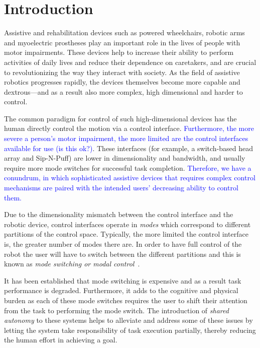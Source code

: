 \documentclass[conference]{IEEEtran}
\begin{document}
\IEEEpeerreviewmaketitle

\section{Introduction}

Assistive and rehabilitation devices such as powered wheelchairs, robotic arms and myoelectric prostheses play an important role in the lives of people with motor impairments. These devices help to increase their ability to perform activities of daily lives and reduce their dependence on caretakers, and are crucial to revolutionizing the way they interact with society. As the field of assistive robotics progresses rapidly, the devices themselves become more capable and dextrous---and as a result also more complex, high dimensional and harder to control. 

The common paradigm for control of such high-dimensional devices has the human directly control the motion via a control interface. \textcolor{blue}{Furthermore, the more severe a person's motor impairment, the more limited are the control interfaces available for use (is this ok?)}. These interfaces (for example, a switch-based head array and Sip-N-Puff) are lower in dimensionality and bandwidth, and usually require more mode switches for successful task completion. \textcolor{blue}{Therefore, we have a conundrum, in which sophisticated assistive devices that requires complex control mechanisms are paired with the intended users' decreasing ability to control them.}

Due to the dimensionality mismatch between the control interface and the robotic device, control interfaces operate in \textit{modes} which correspond to different partitions of the control space. Typically, the more limited the control interface is, the greater number of modes there are. In order to have full control of the robot the user will have to switch between the different partitions and this is known as \textit{mode switching or modal control}~\cite{tsui2008development, nuttin2002selection}. 

It has been established that mode switching is expensive and as a result task performance is degraded. Furthermore, it adds to the cognitive and physical burden as each of these mode switches requires the user to shift their attention from the task to performing the mode switch. The introduction of \textit{shared autonomy} to these systems helps to alleviate and address some of these issues by letting the system take responsibility of task execution partially, thereby reducing the human effort in achieving a goal. 
\end{document}
